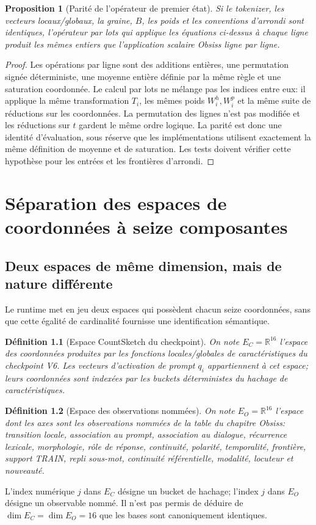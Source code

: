 \documentclass[11pt,a4paper]{report}
\newtheorem{definition}{Définition}[chapter]
\newtheorem{proposition}[definition]{Proposition}
\begin{document}
\begin{proposition}[Parité de l'opérateur de premier état]
Si le tokenizer, les vecteurs locaux/globaux, la graine, $B$, les poids et les conventions d'arrondi sont identiques, l'opérateur par lots qui applique les équations ci-dessus à chaque ligne produit les mêmes entiers que l'application scalaire Obsiss ligne par ligne.
\end{proposition}
\begin{proof}
Les opérations par ligne sont des additions entières, une permutation signée déterministe, une moyenne entière définie par la même règle et une saturation coordonnée. Le calcul par lots ne mélange pas les indices entre eux: il applique la même transformation $T_i$, les mêmes poids $W_i^h,W_i^p$ et la même suite de réductions sur les coordonnées. La permutation des lignes n'est pas modifiée et les réductions sur $t$ gardent le même ordre logique. La parité est donc une identité d'évaluation, sous réserve que les implémentations utilisent exactement la même définition de moyenne et de saturation. Les tests doivent vérifier cette hypothèse pour les entrées et les frontières d'arrondi.
\end{proof}

\chapter{Séparation des espaces de coordonnées à seize composantes}
\section{Deux espaces de même dimension, mais de nature différente}
Le runtime met en jeu deux espaces qui possèdent chacun seize coordonnées, sans que cette égalité de cardinalité fournisse une identification sémantique.
\begin{definition}[Espace CountSketch du checkpoint]
On note $E_C=\mathbb R^{16}$ l'espace des coordonnées produites par les fonctions locales/globales de caractéristiques du checkpoint V6. Les vecteurs d'activation de prompt $q_i$ appartiennent à cet espace; leurs coordonnées sont indexées par les buckets déterministes du hachage de caractéristiques.
\end{definition}
\begin{definition}[Espace des observations nommées]
On note $E_O=\mathbb R^{16}$ l'espace dont les axes sont les observations nommées de la table du chapitre Obsiss: transition locale, association au prompt, association au dialogue, récurrence lexicale, morphologie, rôle de réponse, continuité, polarité, temporalité, frontière, support TRAIN, repli sous-mot, continuité référentielle, modalité, locuteur et nouveauté.
\end{definition}
L'index numérique $j$ dans $E_C$ désigne un bucket de hachage; l'index $j$ dans $E_O$ désigne un observable nommé. Il n'est pas permis de déduire de $\dim E_C=\dim E_O=16$ que les bases sont canoniquement identiques.
\end{document}
